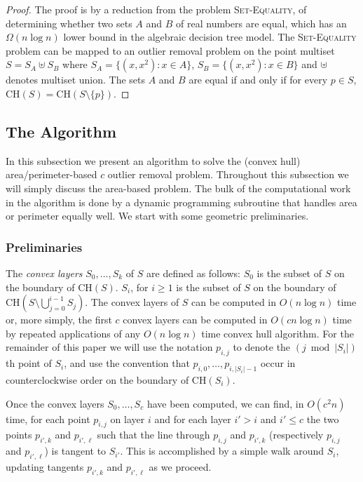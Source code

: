 \documentclass[lotsofwhite]{patmorin}
\newcommand{\ch}{\mathrm{CH}}
\begin{document}
\begin{proof}
The proof is by a reduction from the problem \textsc{Set-Equality}, of
determining whether two sets $A$ and $B$ of real numbers are equal,
which has an $\Omega(n\log n)$ lower bound in the algebraic decision
tree model.  The \textsc{Set-Equality} problem can be mapped to an
outlier removal problem on the point multiset $S=S_A \uplus S_B$ where
$S_A=\{(x,x^2): x\in A\}$, $S_B=\{(x,x^2):x\in B\}$ and $\uplus$
denotes multiset union. The sets $A$ and $B$ are equal if and only if
for every $p\in S$, $\ch(S)=\ch(S\setminus\{p\})$. 
\end{proof}

\subsection{The Algorithm}

In this subsection we present an algorithm to solve the (convex hull)
area/perimeter-based $c$ outlier removal problem.  Throughout this
subsection we will simply discuss the area-based problem.  The bulk of
the computational work in the algorithm is done by a dynamic
programming subroutine that handles area or perimeter equally well.
We start with some geometric preliminaries.

\subsubsection{Preliminaries} 

The \emph{convex layers} $S_0,\ldots,S_k$ of $S$ are defined as
follows: $S_0$ is the subset of $S$ on the boundary of $\ch(S)$.
$S_i$, for $i\ge 1$ is the subset of $S$ on the boundary of
$\ch(S\setminus\bigcup_{j=0}^{i-1} S_j)$.  The convex layers of $S$
can be computed in $O(n\log n)$ time \cite{c85,hs92} or, more simply,
the first $c$ convex layers can be computed in $O(cn\log n)$ time by
repeated applications of any $O(n\log n)$ time convex hull algorithm.
For the remainder of this paper we will use the notation $p_{i,j}$ to
denote the $(j\bmod |S_i|)$th point of $S_i$, and use the convention
that $p_{i,0},\ldots,p_{i,|S_i|-1}$ occur in counterclockwise order on
the boundary of $\ch(S_i)$.

Once the convex layers $S_0,\ldots,S_c$ have been computed, we can
find, in $O(c^2 n)$ time, for each point $p_{i,j}$ on layer $i$ and
for each layer $i'> i$ and $i'\le c$ the two points $p_{i',k}$ and
$p_{i',\ell}$ such that the line through $p_{i,j}$ and $p_{i',k}$
(respectively $p_{i,j}$ and $p_{i',\ell}$) is tangent to $S_{i'}$.
This is accomplished by a simple walk around $S_i$, updating tangents
$p_{i',k}$ and $p_{i',\ell}$ as we proceed.
\end{document}
